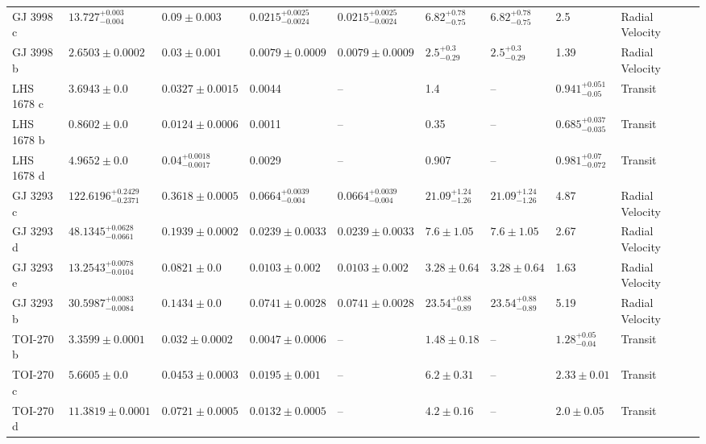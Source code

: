 \begin{tabular}{llllllllll}
GJ 3998 c & $13.727^{+0.003}_{-0.004}$ & $0.09 \pm 0.003$ & $0.0215^{+0.0025}_{-0.0024}$ & $0.0215^{+0.0025}_{-0.0024}$ & $6.82^{+0.78}_{-0.75}$ & $6.82^{+0.78}_{-0.75}$ & 2.5 & Radial Velocity & \cite{STEFANOV_ET_AL__2025} \\
GJ 3998 b & $2.6503 \pm 0.0002$ & $0.03 \pm 0.001$ & $0.0079 \pm 0.0009$ & $0.0079 \pm 0.0009$ & $2.5^{+0.3}_{-0.29}$ & $2.5^{+0.3}_{-0.29}$ & 1.39 & Radial Velocity & \cite{STEFANOV_ET_AL__2025} \\
LHS 1678 c & $3.6943 \pm 0.0$ & $0.0327 \pm 0.0015$ & 0.0044 & -- & 1.4 & -- & $0.941^{+0.051}_{-0.05}$ & Transit & \cite{SILVERSTEIN_ET_AL_2024} \\
LHS 1678 b & $0.8602 \pm 0.0$ & $0.0124 \pm 0.0006$ & 0.0011 & -- & 0.35 & -- & $0.685^{+0.037}_{-0.035}$ & Transit & \cite{SILVERSTEIN_ET_AL_2024} \\
LHS 1678 d & $4.9652 \pm 0.0$ & $0.04^{+0.0018}_{-0.0017}$ & 0.0029 & -- & 0.907 & -- & $0.981^{+0.07}_{-0.072}$ & Transit & \cite{SILVERSTEIN_ET_AL_2024} \\
GJ 3293 c & $122.6196^{+0.2429}_{-0.2371}$ & $0.3618 \pm 0.0005$ & $0.0664^{+0.0039}_{-0.004}$ & $0.0664^{+0.0039}_{-0.004}$ & $21.09^{+1.24}_{-1.26}$ & $21.09^{+1.24}_{-1.26}$ & 4.87 & Radial Velocity & \cite{ASTUDILLO_DEFRU_ET_AL__2017} \\
GJ 3293 d & $48.1345^{+0.0628}_{-0.0661}$ & $0.1939 \pm 0.0002$ & $0.0239 \pm 0.0033$ & $0.0239 \pm 0.0033$ & $7.6 \pm 1.05$ & $7.6 \pm 1.05$ & 2.67 & Radial Velocity & \cite{ASTUDILLO_DEFRU_ET_AL__2017} \\
GJ 3293 e & $13.2543^{+0.0078}_{-0.0104}$ & $0.0821 \pm 0.0$ & $0.0103 \pm 0.002$ & $0.0103 \pm 0.002$ & $3.28 \pm 0.64$ & $3.28 \pm 0.64$ & 1.63 & Radial Velocity & \cite{ASTUDILLO_DEFRU_ET_AL__2017} \\
GJ 3293 b & $30.5987^{+0.0083}_{-0.0084}$ & $0.1434 \pm 0.0$ & $0.0741 \pm 0.0028$ & $0.0741 \pm 0.0028$ & $23.54^{+0.88}_{-0.89}$ & $23.54^{+0.88}_{-0.89}$ & 5.19 & Radial Velocity & \cite{ASTUDILLO_DEFRU_ET_AL__2017} \\
TOI-270 b & $3.3599 \pm 0.0001$ & $0.032 \pm 0.0002$ & $0.0047 \pm 0.0006$ & -- & $1.48 \pm 0.18$ & -- & $1.28^{+0.05}_{-0.04}$ & Transit & \cite{KAYE_ET_AL__2022} \\
TOI-270 c & $5.6605 \pm 0.0$ & $0.0453 \pm 0.0003$ & $0.0195 \pm 0.001$ & -- & $6.2 \pm 0.31$ & -- & $2.33 \pm 0.01$ & Transit & \cite{KAYE_ET_AL__2022} \\
TOI-270 d & $11.3819 \pm 0.0001$ & $0.0721 \pm 0.0005$ & $0.0132 \pm 0.0005$ & -- & $4.2 \pm 0.16$ & -- & $2.0 \pm 0.05$ & Transit & \cite{KAYE_ET_AL__2022} \\

\end{tabular}
